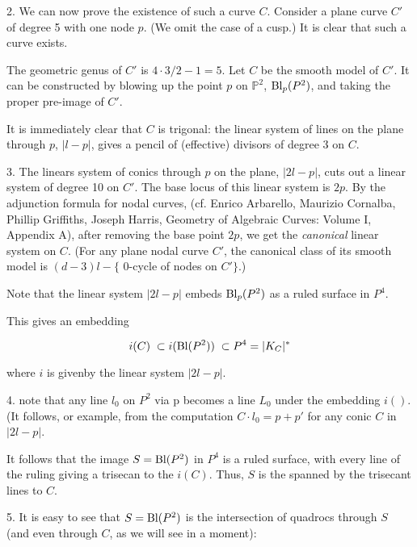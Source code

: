 \documentclass{amsart} %
\newcommand{\<}{\langle }
\renewcommand{\>}{\rangle }
\newcommand{\Bl}{\mathop{\rm Bl}\nolimits}  %
\begin{document}
2. We can now prove the existence of such a curve $C$. Consider a plane curve $C'$
of degree 5 with one node $p$. (We omit the case of a cusp.) It is clear that such a curve exists.

The geometric genus of $C'$ is $4 \cdot 3 / 2 - 1 = 5$. Let $C$ be the smooth model of $C'$.
It can be constructed by blowing up the point $p$ on $\mathbb{P}^2$, $\Bl_p(P^2)$, and taking the proper
pre-image of $C'$.

It is immediately clear that $C$ is trigonal: the linear system of lines
on the plane through $p$, $|l - p|$, gives a pencil of (effective) divisors
of degree 3 on $C$.

\vspace{10mm} %
3. The linears system of conics through $p$ on the plane, $|2 l - p|$,
cuts out a linear system of degree 10 on $C'$. The base locus of this linear 
system is $2p$. By the adjunction formula for nodal curves, (cf. 
Enrico Arbarello, Maurizio Cornalba, Phillip Griffiths, Joseph Harris,
Geometry of Algebraic Curves: Volume I, Appendix A), after removing the base point $2p$, 
we get the {\it canonical } linear system on $C$. (For any plane nodal curve $C'$,
the canonical class of its smooth model is $ (d-3) l - \{ $ 0-cycle of nodes on  $C' \} $.)

Note that the linear system $|2l - p|$ embeds $\Bl_p(P^2)$ as a ruled surface in $P^4$.

This gives an embedding

\[
   i(C) \; \subset i(\Bl(P^2)) \; \subset P^4 = |K_C|^*
\]

where $i$ is givenby the linear system $|2l - p|$.

4. note that any line $l_0$ on $P^2$ via p becomes a line $L_0$ under the embedding
$i()$. (It follows, or example, from the computation $C \cdot l_0 = p + p'$ for
any conic $C$ in $|2l - p|$.

It follows that the image $ S = \Bl(P^2) $ in $P^4$  is a ruled surface, with every line 
of the ruling giving a trisecan to the $ i(C) $. Thus, $ S $ is the spanned by the trisecant lines
to $ C $.


\vspace{10mm} %
5. It is easy to see that $ S = \Bl(P^2) $ is the intersection of quadrocs through $ S $ (and even
through $ C $, as we will see in a moment):
\end{document}
